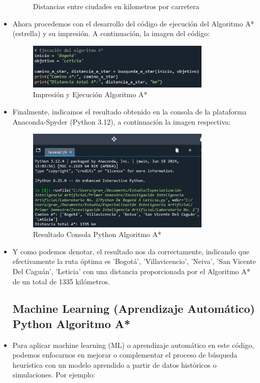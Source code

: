 \documentclass[conference]{IEEEtran}
\begin{document}
\begin{itemize}
\begin{figure}[ht!]
			\caption{Distancias entre ciudades en kilometros por carretera}
			\label{picture}
		\end{figure}	
	\item Ahora procedemos con el desarrollo del código de ejecución del Algoritmo A* (estrella) y su impresión.  A continuación, la imagen del código:
		\begin{figure}[ht!] %
			\centering
			\includegraphics[width=3.45in]{Imagen25.png}
			\caption{Impresión y Ejecución Algoritmo A*}
			\label{picture}
		\end{figure}	
	
	\item Finalmente, indicamos el resultado obtenido en la consola de la plataforma Anaconda-Spyder (Python 3.12), a continuación la imagen respectiva:
		\begin{figure}[ht!] %
			\centering
			\includegraphics[width=3.45in]{Imagen26.png}
			\caption{Resultado Consola Python Algoritmo A*}
			\label{picture}
		\end{figure}	
	\item Y como podemos denotar, el resultado nos da correctamente, indicando que efectivamente la ruta óptima es 'Bogotá', 'Villavicencio', 'Neiva', 'San Vicente Del Caguán', 'Leticia' con una distancia proporcionada por el Algoritmo A* de un total de 1335 kilómetros.
	
	\subsection{Machine Learning (Aprendizaje Automático) Python Algoritmo A*}
	\item Para aplicar machine learning (ML) o aprendizaje automático en este código, podemos enfocarnos en mejorar o complementar el proceso de búsqueda heurística con un modelo aprendido a partir de datos históricos o simulaciones. Por ejemplo:
	

\end{itemize}
\end{document}
